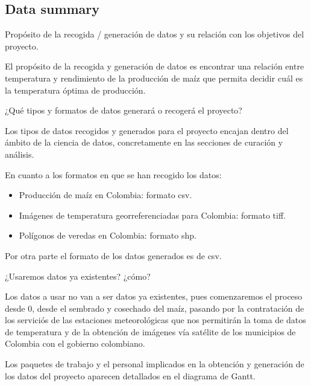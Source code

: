 \documentclass[12pt, spanish]{article}
\begin{document}
\subsection{Data summary}

\begin{shaded}
Propósito de la recogida / generación de datos y su relación con los objetivos del proyecto.
\end{shaded}

El propósito de la recogida y generación de datos es encontrar una relación entre temperatura y rendimiento de la producción de maíz que permita decidir cuál es la temperatura óptima de producción.\\

\begin{shaded}
¿Qué tipos y formatos de datos generará o recogerá  el proyecto?

\end{shaded}

Los tipos de datos recogidos  y generados para el proyecto encajan dentro del ámbito de la ciencia de datos, concretamente en las secciones de curación y análisis.

En cuanto a los formatos en que se han recogido los datos:

\begin{itemize}
    \item Producción de maíz en Colombia: formato csv.
    \item Imágenes de temperatura georreferenciadas para Colombia: formato tiff.
    \item Polígonos de veredas en Colombia: formato shp.
\end{itemize}

Por otra parte el formato de los datos generados es de csv.

\newpage
\begin{shaded}
¿Usaremos datos ya existentes? ¿cómo?
\end{shaded}
Los datos a usar no van a ser datos ya existentes, pues comenzaremos el proceso desde 0, desde el sembrado y cosechado del maíz, pasando por la contratación de los serviciós de las estaciones meteorológicas  que nos permitirán la toma de datos de temperatura y de la obtención de imágenes vía satélite de los municipios de Colombia con el gobierno colombiano.

Los paquetes de trabajo y el personal implicados en la obtención y generación de los datos del proyecto aparecen detallados en el diagrama de Gantt.
\end{document}
